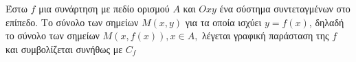 Έστω $f$ μια συνάρτηση με πεδίο ορισμού $Α$ και $Oxy$ ένα σύστημα συντεταγμένων στο επίπεδο. Το σύνολο των σημείων $Μ(x, y)$ για τα οποία ισχύει $y = f(x)$, δηλαδή το σύνολο των σημείων $Μ(x, f(x)),x\in A,$ λέγεται γραφική παράσταση της $f$ και συμβολίζεται συνήθως με $C_f$
